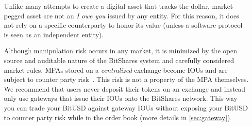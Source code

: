 Unlike many attempts to create a digital asset that tracks the dollar, market
pegged asset are not an \emph{I owe you} issued by any entity. For this reason,
it does not rely on a specific counterparty to honor its value (unless a
software protocol is seen as an independent entity). 

Although manipulation risk occurs in any market, it is minimized by the open
source and auditable nature of the BitShares system and carefully considered
market rules. MPAs stored on a \emph{centralized} exchange become IOUs and are
subject to counter party risk~\cite{mtgox}. This risk is not a property of the
MPA themselves. We recommend that users never deposit their tokens on an
exchange and instead only use gateways that issue their IOUs onto the BitShares
network. This way you can trade your BitUSD against gateway IOUs without
exposing your BitUSD to counter party risk while in the order book (more
details in \cref{sec:gateway}).
